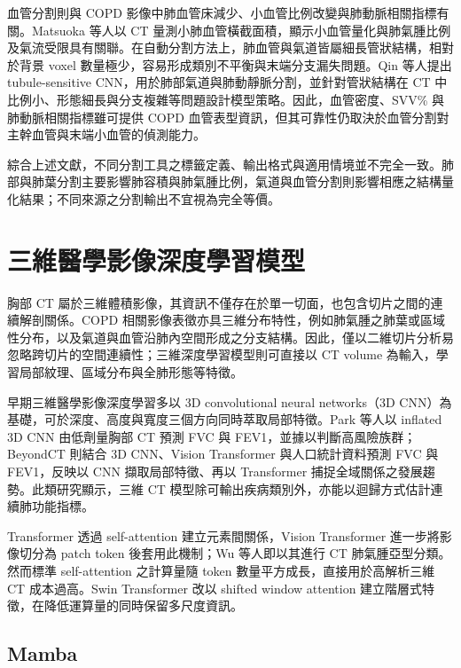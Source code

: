 \begin{ZhChapter}
血管分割則與 COPD 影像中肺血管床減少、小血管比例改變與肺動脈相關指標有關。Matsuoka 等人以 CT 量測小肺血管橫截面積，顯示小血管量化與肺氣腫比例及氣流受限具有關聯\cite{matsuoka2010smallvessel}。在自動分割方法上，肺血管與氣道皆屬細長管狀結構，相對於背景 voxel 數量極少，容易形成類別不平衡與末端分支漏失問題。Qin 等人提出 tubule-sensitive CNN，用於肺部氣道與肺動靜脈分割，並針對管狀結構在 CT 中比例小、形態細長與分支複雜等問題設計模型策略\cite{qin2021tubulesensitive}。因此，血管密度、SVV\% 與肺動脈相關指標雖可提供 COPD 血管表型資訊，但其可靠性仍取決於血管分割對主幹血管與末端小血管的偵測能力。

綜合上述文獻，不同分割工具之標籤定義、輸出格式與適用情境並不完全一致。肺部與肺葉分割主要影響肺容積與肺氣腫比例，氣道與血管分割則影響相應之結構量化結果；不同來源之分割輸出不宜視為完全等價。

\section{三維醫學影像深度學習模型}

胸部 CT 屬於三維體積影像，其資訊不僅存在於單一切面，也包含切片之間的連續解剖關係。COPD 相關影像表徵亦具三維分布特性，例如肺氣腫之肺葉或區域性分布，以及氣道與血管沿肺內空間形成之分支結構。因此，僅以二維切片分析易忽略跨切片的空間連續性；三維深度學習模型則可直接以 CT volume 為輸入，學習局部紋理、區域分布與全肺形態等特徵。

早期三維醫學影像深度學習多以 3D convolutional neural networks（3D CNN）為基礎，可於深度、高度與寬度三個方向同時萃取局部特徵。Park 等人以 inflated 3D CNN 由低劑量胸部 CT 預測 FVC 與 FEV1，並據以判斷高風險族群\cite{park2023dlpulmonaryct}；BeyondCT 則結合 3D CNN、Vision Transformer 與人口統計資料預測 FVC 與 FEV1，反映以 CNN 擷取局部特徵、再以 Transformer 捕捉全域關係之發展趨勢\cite{geng2024beyondct}。此類研究顯示，三維 CT 模型除可輸出疾病類別外，亦能以迴歸方式估計連續肺功能指標。

Transformer 透過 self-attention 建立元素間關係，Vision Transformer 進一步將影像切分為 patch token 後套用此機制\cite{dosovitskiy2021vit}；Wu 等人即以其進行 CT 肺氣腫亞型分類\cite{wu2021emphysemavit}。然而標準 self-attention 之計算量隨 token 數量平方成長，直接用於高解析三維 CT 成本過高。Swin Transformer 改以 shifted window attention 建立階層式特徵，在降低運算量的同時保留多尺度資訊\cite{liu2021swin}。

\subsection{Mamba}


\end{ZhChapter}
